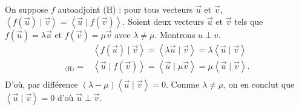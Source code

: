 
\bigskip

\begin{prv}
	On suppose $f$\/ autoadjoint (H) : pour tous vecteurs $\vec{u}$\/ et $\vec{v}$, $\left<f(\vec{u})  \mid \vec{v} \right> = \left<\vec{u}  \mid f(\vec{v}) \right>$.
	Soient deux vecteurs $\vec{u}$\/ et $\vec{v}$\/ tels que $f(\vec{u}) = \lambda \vec{u}$\/ et $f(\vec{v}) = \mu \vec{v}$\/ avec $\lambda \neq \mu$.
	Montrons $u \perp v$.
	\begin{align*}
		&\left<f(\vec{u})  \mid \vec{v} \right> = \left<\lambda \vec{u}  \mid \vec{v} \right> = \lambda \left<\vec{u}  \mid \vec{v} \right>\\
		{}_{\text{(H)}}=& \left<\vec{u}  \mid f(\vec{v}) \right> = \left<\vec{u}  \mid \mu \vec{v} \right> = \mu \left<\vec{u}  \mid \vec{v} \right>.\\
	\end{align*}
	D'où, par différence $(\lambda - \mu) \left<\vec{u} \mid \vec{v} \right> = 0$. Comme $\lambda \neq \mu$, on en conclut que $\left<\vec{u} \mid \vec{v} \right> = 0$\/ d'où $\vec{u} \perp \vec{v}$.



\end{prv}

